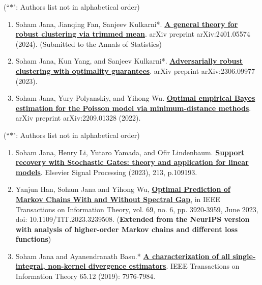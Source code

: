 \documentclass[letterpaper,12pt,oneside]{article}
\theoremstyle{definition}
\begin{document}
			
			 (``$\ast$": Authors list not in alphabetical order)
			
			\begin{enumerate}
				\item Soham Jana, Jianqing Fan, Sanjeev Kulkarni*. \href{https://arxiv.org/abs/2401.05574}{\bf A general theory for robust clustering via trimmed mean}. arXiv preprint arXiv:2401.05574 (2024). (Submitted to the Annals of Statistics)
				
				\item Soham Jana, Kun Yang, and Sanjeev Kulkarni*. \href{https://arxiv.org/abs/2306.09977}{\bf Adversarially robust clustering with optimality guarantees}. arXiv preprint arXiv:2306.09977 (2023).
				
				\item Soham Jana, Yury Polyanskiy, and Yihong Wu. \href{https://arxiv.org/abs/2209.01328}{\bf Optimal empirical Bayes estimation for the Poisson model via minimum-distance methods}. arXiv preprint arXiv:2209.01328 (2022).
				
				
			\end{enumerate}
			
			 (``$\ast$": Authors list not in alphabetical order)
			
			\begin{enumerate}
				\item Soham Jana, Henry Li, Yutaro Yamada, and Ofir Lindenbaum. {\bf \href{https://www.sciencedirect.com/science/article/abs/pii/S0165168423002670}{\bf Support recovery with Stochastic Gates: theory and application for linear models}}. Elsevier Signal Processing (2023), 213, p.109193.
				
				\item Yanjun Han, Soham Jana and Yihong Wu, \href{https://ieeexplore.ieee.org/abstract/document/10028667}{\bf Optimal Prediction of Markov Chains With and Without Spectral Gap}, in IEEE Transactions on Information Theory, vol. 69, no. 6, pp. 3920-3959, June 2023, doi: 10.1109/TIT.2023.3239508. (\textbf{Extended from the NeurIPS version with analysis of higher-order Markov chains and different loss functions})
				
				\item Soham Jana and Ayanendranath Basu.* \href{https://janasoham.github.io/files/bregman_charac.pdf}{\bf A characterization of all single-integral, non-kernel divergence estimators}. IEEE Transactions on Information Theory 65.12 (2019): 7976-7984.
				
			\end{enumerate}
			
\end{document}
